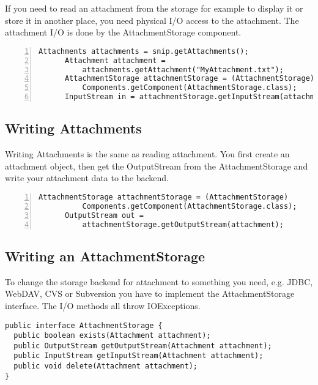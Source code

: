 \documentclass[a4paper,pdftex]{article}
\begin{document}
If you need to read an attachment from  the storage for example to display it or store it in another place, you need physical I/O access to the attachment. The attachment I/O is done by the AttachmentStorage component.

\begin{Verbatim}[gobble=6,frame=single,numbers=left,fontsize=\small]
      Attachments attachments = snip.getAttachments();
      Attachment attachment =
          attachments.getAttachment("MyAttachment.txt");
      AttachmentStorage attachmentStorage = (AttachmentStorage)
          Components.getComponent(AttachmentStorage.class);
      InputStream in = attachmentStorage.getInputStream(attachment);
\end{Verbatim}

\subsection{Writing Attachments}

Writing Attachments is the same as reading attachment. You first create an attachment object,
then get the OutputStream from the AttachmentStorage and write your attachment data to the
backend.

\begin{Verbatim}[gobble=6,frame=single,numbers=left,fontsize=\small]
      AttachmentStorage attachmentStorage = (AttachmentStorage)
          Components.getComponent(AttachmentStorage.class);
      OutputStream out =
          attachmentStorage.getOutputStream(attachment);
\end{Verbatim}

\subsection{Writing an AttachmentStorage}

To change the storage backend for attachment to something you need, e.g. JDBC, WebDAV, CVS or Subversion
you have to implement the AttachmentStorage interface. The I/O methods all throw IOExceptions.

\begin{verbatim}
public interface AttachmentStorage {
  public boolean exists(Attachment attachment);
  public OutputStream getOutputStream(Attachment attachment);
  public InputStream getInputStream(Attachment attachment);
  public void delete(Attachment attachment);
}
\end{verbatim}
\end{document}

